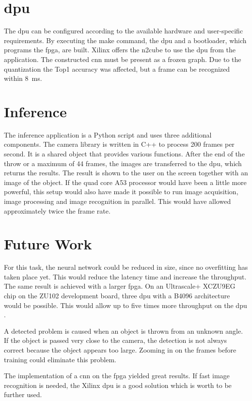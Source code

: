 \section{\Acrlong{dpu}}
\label{sec:conclusion:dpu}
The \acrshort{dpu} can be configured according to the available hardware and user-specific requirements.
By executing the make command, the \acrshort{dpu} and a bootloader, which programs the \acrshort{fpga}, are built.
Xilinx offers the \acrshort{n2cube}  to use the \acrshort{dpu} from the application.
The constructed \acrshort{cnn} must be present as a frozen graph.
Due to the quantization the Top1 accuracy was affected, but a frame can be recognized within \SI{8}{ms}. 

\section{Inference}
\label{sec:conclusion:inference}
The inference application is a Python script and uses three additional components.
The camera library is written in C++ to process 200 frames per second.
It is a shared object that provides various functions.
After the end of the throw or a maximum of 44 frames, the images are transferred to the \acrshort{dpu}, which returns the results.
The result is shown to the user on the screen together with an image of the object.
If the quad core A53 processor would have been a little more powerful, this setup would also have made it possible to run image acquisition, image processing and image recognition in parallel.
This would have allowed approximately twice the frame rate. 

\section{Future Work}
\label{sec:conclusion:future_work}
For this task, the neural network could be reduced in size, since no overfitting has taken place yet.
This would reduce the latency time and increase the throughput.
The same result is achieved with a larger \acrshort{fpga}.
On an Ultrascale+ XCZU9EG chip on the ZU102 development board, three \acrshort{dpu}  with a B4096 architecture would be possible.
This would allow up to five times more throughput on the \acrshort{dpu} \cite{dpu_product_guide}.

A detected problem is caused when an object is thrown from an unknown angle. 
If the object is passed very close to the camera, the detection is not always correct because the object appears too large.
Zooming in on the frames before training could eliminate this problem.

The implementation of a \acrlong{cnn} on the \acrshort{fpga} yielded great results.
If fast image recognition is needed, the Xilinx \acrshort{dpu} is a good solution which is worth to be further used.

